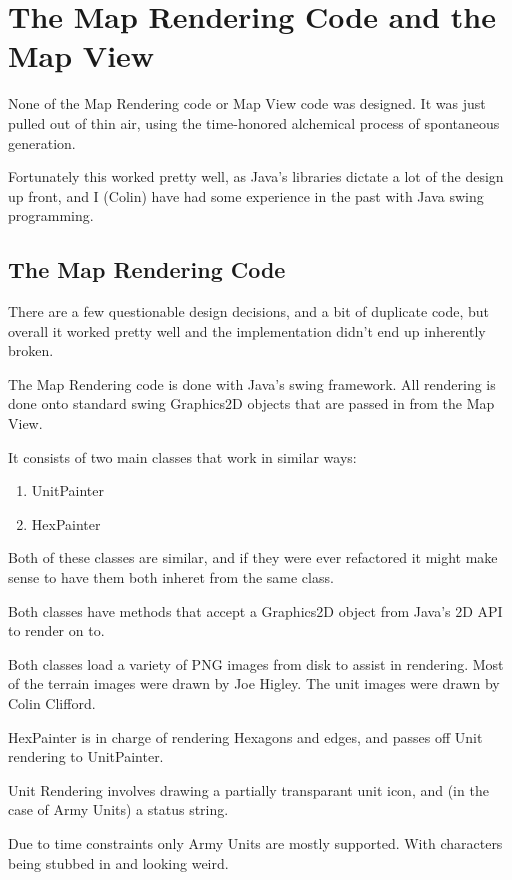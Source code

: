 \documentclass[12pt,a4paper]{article}
\begin{document}
\section{The Map Rendering Code and the Map View}

None of the Map Rendering code or Map View code was designed.
It was just pulled out of thin air, using the time-honored alchemical process
of spontaneous generation.

Fortunately this worked pretty well, as Java's libraries dictate a lot
of the design up front, and I (Colin) have had some experience in the past
with Java swing programming.

\subsection{The Map Rendering Code}
There are a few questionable design decisions, and a bit of duplicate code,
but overall it worked pretty well and the implementation didn't end up
inherently broken.

The Map Rendering code is done with Java's swing framework. All rendering
is done onto standard swing Graphics2D objects that are passed in from the
Map View.

It consists of two main classes that work in similar ways:
\begin{enumerate}
\item{UnitPainter}
\item{HexPainter}
\end{enumerate}

Both of these classes are similar, and if they were ever refactored it might
make sense to have them both inheret from the same class.

Both classes have methods that accept a Graphics2D object from Java's 2D API
to render on to.

Both classes load a variety of PNG images from disk to assist in rendering.
Most of the terrain images were drawn by Joe Higley.
The unit images were drawn by Colin Clifford.

HexPainter is in charge of rendering Hexagons and edges,
and passes off Unit rendering to UnitPainter.

Unit Rendering involves drawing a partially transparant unit icon,
and (in the case of Army Units) a status string.

Due to time constraints only Army Units are mostly supported. With characters
being stubbed in and looking weird.
\end{document}

